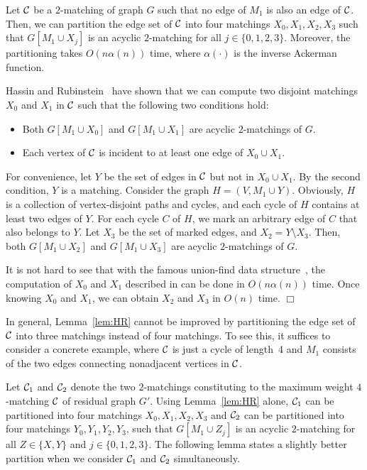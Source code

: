 \documentclass[11pt,twoside]{article}\usepackage{amssymb,latexsym,graphicx,hyperref}\usepackage{epstopdf}
\newenvironment{proof}{{\sc Proof. }}{\hfill$\Box$\vspace{0.2in}}
\begin{document}
\begin{lemma}
\label{lem:HR}
Let ${\cal C}$ be a $2$-matching of graph $G$ such that no edge of $M_1$ is also an edge of ${\cal C}$.
Then, we can partition the edge set of ${\cal C}$ into four matchings $X_0, X_1, X_2, X_3$ 
such that $G[M_1 \cup X_j]$ is an acyclic $2$-matching for all $j \in \{0, 1, 2, 3\}$.
Moreover, the partitioning takes $O(n \alpha(n))$ time, where $\alpha(\cdot)$ is the inverse Ackerman function. 
\end{lemma}
\begin{proof}
Hassin and Rubinstein~\cite{HR00} have shown that we can compute two disjoint matchings 
$X_0$ and $X_1$ in ${\cal C}$ such that the following two conditions hold:
\begin{itemize}
\item
	Both $G[M_1\cup X_0]$ and $G[M_1\cup X_1]$ are acyclic $2$-matchings of $G$.
\item
	Each vertex of ${\cal C}$ is incident to at least one edge of $X_0 \cup X_1$. 
\end{itemize}
For convenience, let $Y$ be the set of edges in ${\cal C}$ but not in $X_0 \cup X_1$.
By the second condition, $Y$ is a matching.
Consider the graph $H = (V, M_1 \cup Y)$.
Obviously, $H$ is a collection of vertex-disjoint paths and cycles, and each cycle of $H$ contains at least two edges of $Y$.
For each cycle $C$ of $H$, we mark an arbitrary edge of $C$ that also belongs to $Y$.
Let $X_3$ be the set of marked edges, and $X_2 = Y \setminus X_3$.
Then, both $G[M_1\cup X_2]$ and $G[M_1\cup X_3]$ are acyclic $2$-matchings of $G$. 

It is not hard to see that with the famous union-find data structure~\cite{Tar75}, 
the computation of $X_0$ and $X_1$ described in \cite{HR00} can be done in $O\left(n\alpha(n)\right)$ time.
Once knowing $X_0$ and $X_1$, we can obtain $X_2$ and $X_3$ in $O(n)$ time. 
\end{proof}


In general, Lemma~\ref{lem:HR} cannot be improved by partitioning the edge set of 
${\cal C}$ into three matchings instead of four matchings. To see this, it suffices to 
consider a concrete example, where ${\cal C}$ is just a cycle of length~4 and 
$M_1$ consists of the two edges connecting nonadjacent vertices in ${\cal C}$.


Let ${\cal C}_1$ and ${\cal C}_2$ denote the two $2$-matchings constituting to the maximum weight $4$-matching ${\cal C}$ of residual graph $G'$.
Using Lemma~\ref{lem:HR} alone, ${\cal C}_1$ can be partitioned into four matchings $X_0, X_1, X_2, X_3$ and
${\cal C}_2$ can be partitioned into four matchings $Y_0, Y_1, Y_2, Y_3$,
such that $G[M_1 \cup Z_j]$ is an acyclic $2$-matching for all $Z \in \{X, Y\}$ and $j \in \{0, 1, 2, 3\}$.
The following lemma states a slightly better partition when we consider ${\cal C}_1$ and ${\cal C}_2$ simultaneously.
\end{document}
